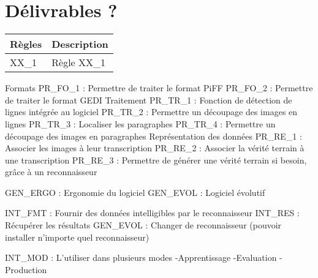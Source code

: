 \section{Délivrables ?}

\begin{mdframed}[frametitle={Figure N : LOT 1 - X}, innerbottommargin=10]
\begin{center}
\begin{tabular}{ | l | l | }
\hline
{\textbf{Règles}}   &   {\textbf{Description}} \\ \hline
{XX\_1}              &   {Règle XX\_1} \\ \hline
\end{tabular}
\end{center}
\end{mdframed}

Formats
PR\_FO\_1 : Permettre de traiter le format PiFF
PR\_FO\_2 : Permettre de traiter le format GEDI
Traitement
PR\_TR\_1 : Fonction de détection de lignes intégrée au logiciel
PR\_TR\_2 : Permettre un découpage des images en lignes
PR\_TR\_3 : Localiser les paragraphes
PR\_TR\_4 : Permettre un découpage des images en paragraphes
Représentation des données
PR\_RE\_1 : Associer les images à leur transcription
PR\_RE\_2 : Associer la vérité terrain à une transcription
PR\_RE\_3 : Permettre de générer une vérité terrain si besoin, grâce à un reconnaisseur

GEN\_ERGO : Ergonomie du logiciel
GEN\_EVOL : Logiciel évolutif

INT\_FMT : Fournir des données intelligibles par le reconnaisseur
INT\_RES : Récupérer les résultats
GEN\_EVOL : Changer de reconnaisseur (pouvoir installer n’importe quel reconnaisseur)

INT\_MOD : L’utiliser dans plusieurs modes
-Apprentissage
-Evaluation
-Production

